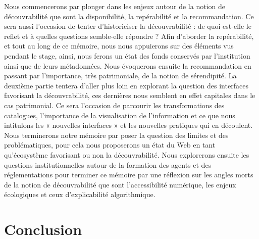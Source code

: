 \documentclass[a4paper,12pt,twoside]{book}
\begin{document}
	Nous commencerons par plonger dans les enjeux autour de la notion de découvrabilité que sont la disponibilité, la repérabilité et la recommandation. Ce sera aussi l’occasion de tenter d’historiciser la découvrabilité : de quoi est-elle le reflet et à quelles questions semble-elle répondre ? Afin d’aborder la repérabilité, et tout au long de ce mémoire, nous nous appuierons sur des éléments vus pendant le stage, ainsi, nous ferons un état des fonds conservés par l’institution ainsi que de leurs métadonnées. Nous évoquerons ensuite la recommandation en passant par l’importance, très patrimoniale, de la notion de sérendipité. La deuxième partie tentera d’aller plus loin en explorant la question des interfaces favorisant la découvrabilité, ces dernières nous semblent en effet capitales dans le cas patrimonial. Ce sera l’occasion de parcourir les transformations des catalogues, l’importance de la visualisation de l’information et ce que nous intitulons les « nouvelles interfaces » et les nouvelles pratiques qui en découlent. Nous terminerons notre mémoire par poser la question des limites et des problématiques, pour cela nous proposerons un état du Web en tant qu’écosystème favorisant ou non la découvrabilité. Nous explorerons ensuite les questions institutionnelles autour de la formation des agents et des réglementations pour terminer ce mémoire par une réflexion sur les angles morts de la notion de découvrabilité que sont l’accessibilité numérique, les enjeux écologiques et ceux d’explicabilité algorithmique.
	\newpage{\pagestyle{empty}\cleardoublepage}
	
	\mainmatter
	
	
	

	
	


	

	
	
	
	
	\chapter*{Conclusion}
		
\end{document}
